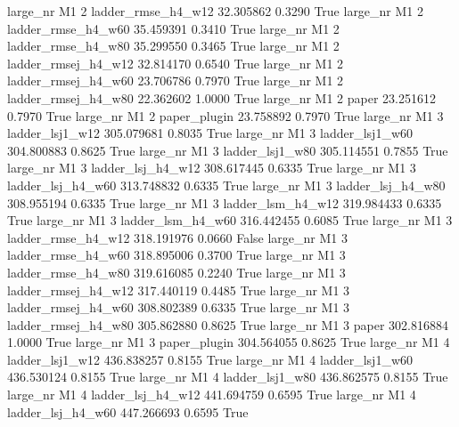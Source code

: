   large_nr       M1                 2  ladder_rmse_h4_w12   32.305862      0.3290    True
  large_nr       M1                 2  ladder_rmse_h4_w60   35.459391      0.3410    True
  large_nr       M1                 2  ladder_rmse_h4_w80   35.299550      0.3465    True
  large_nr       M1                 2 ladder_rmsej_h4_w12   32.814170      0.6540    True
  large_nr       M1                 2 ladder_rmsej_h4_w60   23.706786      0.7970    True
  large_nr       M1                 2 ladder_rmsej_h4_w80   22.362602      1.0000    True
  large_nr       M1                 2               paper   23.251612      0.7970    True
  large_nr       M1                 2        paper_plugin   23.758892      0.7970    True
  large_nr       M1                 3     ladder_lsj1_w12  305.079681      0.8035    True
  large_nr       M1                 3     ladder_lsj1_w60  304.800883      0.8625    True
  large_nr       M1                 3     ladder_lsj1_w80  305.114551      0.7855    True
  large_nr       M1                 3   ladder_lsj_h4_w12  308.617445      0.6335    True
  large_nr       M1                 3   ladder_lsj_h4_w60  313.748832      0.6335    True
  large_nr       M1                 3   ladder_lsj_h4_w80  308.955194      0.6335    True
  large_nr       M1                 3   ladder_lsm_h4_w12  319.984433      0.6335    True
  large_nr       M1                 3   ladder_lsm_h4_w60  316.442455      0.6085    True
  large_nr       M1                 3  ladder_rmse_h4_w12  318.191976      0.0660   False
  large_nr       M1                 3  ladder_rmse_h4_w60  318.895006      0.3700    True
  large_nr       M1                 3  ladder_rmse_h4_w80  319.616085      0.2240    True
  large_nr       M1                 3 ladder_rmsej_h4_w12  317.440119      0.4485    True
  large_nr       M1                 3 ladder_rmsej_h4_w60  308.802389      0.6335    True
  large_nr       M1                 3 ladder_rmsej_h4_w80  305.862880      0.8625    True
  large_nr       M1                 3               paper  302.816884      1.0000    True
  large_nr       M1                 3        paper_plugin  304.564055      0.8625    True
  large_nr       M1                 4     ladder_lsj1_w12  436.838257      0.8155    True
  large_nr       M1                 4     ladder_lsj1_w60  436.530124      0.8155    True
  large_nr       M1                 4     ladder_lsj1_w80  436.862575      0.8155    True
  large_nr       M1                 4   ladder_lsj_h4_w12  441.694759      0.6595    True
  large_nr       M1                 4   ladder_lsj_h4_w60  447.266693      0.6595    True
